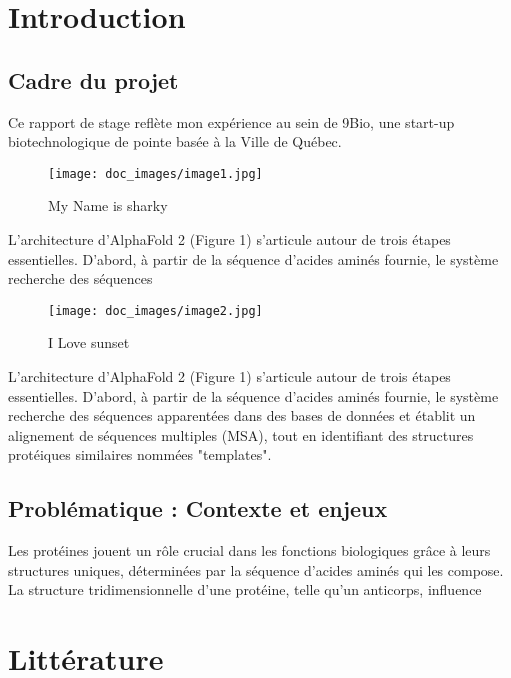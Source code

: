 \section{Introduction}
\subsection{Cadre du projet}
Ce rapport de stage reflète mon expérience au sein de 9Bio, une start-up biotechnologique de pointe basée à la Ville de Québec.\begin{figure}[H]
\centering
\texttt{[image: doc\_images/image1.jpg]}
\caption{\label{My_Name_is_sharky} My Name is sharky}\end{figure}L’architecture d’AlphaFold 2 (Figure 1) s’articule autour de trois étapes essentielles. D’abord, à partir de la séquence d’acides aminés fournie, le système recherche des séquences\begin{figure}[H]
\centering
\texttt{[image: doc\_images/image2.jpg]}
\caption{\label{I_Love_sunset} I Love sunset}\end{figure}L’architecture d’AlphaFold 2 (Figure 1) s’articule autour de trois étapes essentielles. D’abord, à partir de la séquence d’acides aminés fournie, le système recherche des séquences apparentées dans des bases de données et établit un alignement de séquences multiples (MSA), tout en identifiant des structures protéiques similaires nommées "templates".
\subsection{Problématique : Contexte et enjeux}
Les protéines jouent un rôle crucial dans les fonctions biologiques grâce à leurs structures uniques, déterminées par la séquence d’acides aminés qui les compose. La structure tridimensionnelle d’une protéine, telle qu’un anticorps, influence
\section{Littérature}
